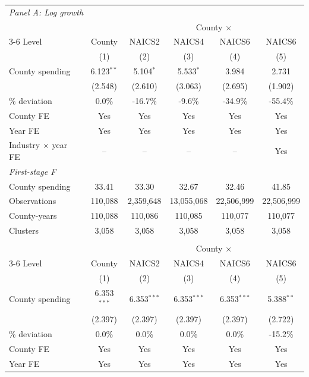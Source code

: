 \begin{tabular*}{\linewidth}{@{\extracolsep{\fill}}lccccc@{}}
\toprule
\multicolumn{6}{l}{\textit{Panel A: Log growth}} \\
\addlinespace[3pt]
 & & \multicolumn{4}{c}{County $\times$} \\
\cmidrule(lr){3-6}
\addlinespace[2pt]
Level & County & NAICS2 & NAICS4 & NAICS6 & NAICS6 \\
 & (1) & (2) & (3) & (4) & (5) \\
\midrule
County spending & 6.123$^{**}$ & 5.104$^{*}$ & 5.533$^{*}$ & 3.984 & 2.731 \\
 & (2.548) & (2.610) & (3.063) & (2.695) & (1.902) \\
\% deviation & 0.0\% & -16.7\% & -9.6\% & -34.9\% & -55.4\% \\
\addlinespace[4pt]
County FE & Yes & Yes & Yes & Yes & Yes \\
Year FE & Yes & Yes & Yes & Yes & Yes \\
Industry $\times$ year FE & -- & -- & -- & -- & Yes \\
\addlinespace[4pt]
\textit{First-stage F} &  &  &  &  &  \\
\hspace{1em}County spending & 33.41 & 33.30 & 32.67 & 32.46 & 41.85 \\
\addlinespace[7pt]
Observations & 110,088 & 2,359,648 & 13,055,068 & 22,506,999 & 22,506,999 \\
County-years & 110,088 & 110,086 & 110,085 & 110,077 & 110,077 \\
Clusters & 3,058 & 3,058 & 3,058 & 3,058 & 3,058 \\
\midrule
\addlinespace[5pt]
\multicolumn{6}{l}{\textit{Panel B: Midpoint growth}} \\
\addlinespace[3pt]
 & & \multicolumn{4}{c}{County $\times$} \\
\cmidrule(lr){3-6}
\addlinespace[2pt]
Level & County & NAICS2 & NAICS4 & NAICS6 & NAICS6 \\
 & (1) & (2) & (3) & (4) & (5) \\
\midrule
County spending & 6.353$^{***}$ & 6.353$^{***}$ & 6.353$^{***}$ & 6.353$^{***}$ & 5.388$^{**}$ \\
 & (2.397) & (2.397) & (2.397) & (2.397) & (2.722) \\
\% deviation & 0.0\% & 0.0\% & 0.0\% & 0.0\% & -15.2\% \\
\addlinespace[4pt]
County FE & Yes & Yes & Yes & Yes & Yes \\
Year FE & Yes & Yes & Yes & Yes & Yes \\

\end{tabular*}
